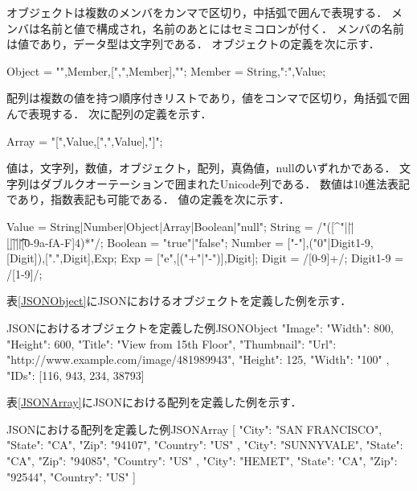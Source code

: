 オブジェクトは複数のメンバをカンマで区切り，中括弧で囲んで表現する．
メンバは名前と値で構成され，名前のあとにはセミコロンが付く．
メンバの名前は値であり，データ型は文字列である．
オブジェクトの定義を次に示す．

\begin{EBNF}
Object = "{",Member,[{",",Member}],"}";
Member = String,":",Value;
\end{EBNF}

配列は複数の値を持つ順序付きリストであり，値をコンマで区切り，角括弧で囲んで表現する．
次に配列の定義を示す．

\begin{EBNF}
Array = "[",Value,[{",",Value}],"]";
\end{EBNF}

値は，文字列，数値，オブジェクト，配列，真偽値，nullのいずれかである．
文字列はダブルクオーテーションで囲まれたUnicode列である．
数値は10進法表記であり，指数表記も可能である．
値の定義を次に示す．

\begin{EBNF}
Value = String|Number|Object|Array|Boolean|"null";
String = /"([^"\]|\n|\"|\\|\b|\f|\r|\t|\u[0-9a-fA-F]{4})*"/;
Boolean = "true"|"false";
Number = ["-"],("0"|Digit1-9,[Digit]),[".",Digit],Exp;
Exp = ["e",[("+"|"-")],Digit];
Digit = /[0-9]+/;
Digit1-9 = /[1-9]/;
\end{EBNF}

表\ref{JSONObject}にJSONにおけるオブジェクトを定義した例を示す．

\begin{FileToPage}{JSONにおけるオブジェクトを定義した例}{JSONObject}
{
  "Image":{
    "Width":  800,
    "Height": 600,
    "Title":  "View from 15th Floor",
    "Thumbnail":{
      "Url":    "http://www.example.com/image/481989943",
      "Height": 125,
      "Width":  "100"
    },
    "IDs": [116, 943, 234, 38793]
  }
}
\end{FileToPage}

表\ref{JSONArray}にJSONにおける配列を定義した例を示す．

\begin{FileToPage}{JSONにおける配列を定義した例}{JSONArray}
[
  {
    "City":      "SAN FRANCISCO",
    "State":     "CA",
    "Zip":       "94107",
    "Country":   "US"
  },
  {
    "City":      "SUNNYVALE",
    "State":     "CA",
    "Zip":       "94085",
    "Country":   "US"
  },
  {
    "City":      "HEMET",
    "State":     "CA",
    "Zip":       "92544",
    "Country":   "US"
  }
]
\end{FileToPage}
